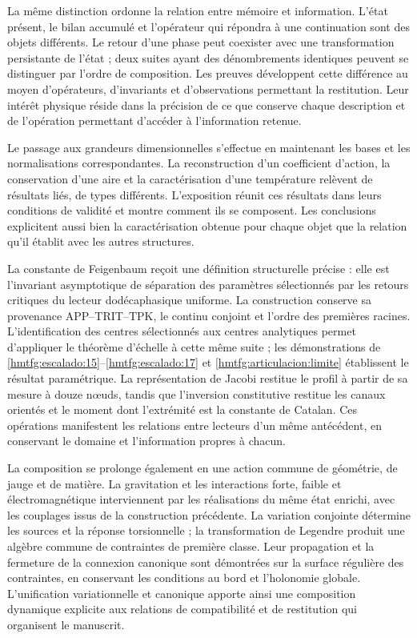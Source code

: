 La même distinction ordonne la relation entre mémoire et information. L'état présent, le bilan accumulé et l'opérateur qui répondra à une continuation sont des objets différents. Le retour d'une phase peut coexister avec une transformation persistante de l'état ; deux suites ayant des dénombrements identiques peuvent se distinguer par l'ordre de composition. Les preuves développent cette différence au moyen d'opérateurs, d'invariants et d'observations permettant la restitution. Leur intérêt physique réside dans la précision de ce que conserve chaque description et de l'opération permettant d'accéder à l'information retenue.

Le passage aux grandeurs dimensionnelles s'effectue en maintenant les bases et les normalisations correspondantes. La reconstruction d'un coefficient d'action, la conservation d'une aire et la caractérisation d'une température relèvent de résultats liés, de types différents. L'exposition réunit ces résultats dans leurs conditions de validité et montre comment ils se composent. Les conclusions explicitent aussi bien la caractérisation obtenue pour chaque objet que la relation qu'il établit avec les autres structures.

La constante de Feigenbaum reçoit une définition structurelle précise : elle est l’invariant asymptotique de séparation des paramètres sélectionnés par les retours critiques du lecteur dodécaphasique uniforme. La construction conserve sa provenance APP--TRIT--TPK, le continu conjoint et l’ordre des premières racines. L’identification des centres sélectionnés aux centres analytiques permet d’appliquer le théorème d’échelle à cette même suite ; les démonstrations de \ref{hmtfg:escalado:15}--\ref{hmtfg:escalado:17} et \eqref{hmtfg:articulacion:limite} établissent le résultat paramétrique. La représentation de Jacobi restitue le profil à partir de sa mesure à douze nœuds, tandis que l’inversion constitutive restitue les canaux orientés et le moment dont l’extrémité est la constante de Catalan. Ces opérations manifestent les relations entre lecteurs d’un même antécédent, en conservant le domaine et l’information propres à chacun.

La composition se prolonge également en une action commune de géométrie, de jauge et de matière. La gravitation et les interactions forte, faible et électromagnétique interviennent par les réalisations du même état enrichi, avec les couplages issus de la construction précédente. La variation conjointe détermine les sources et la réponse torsionnelle ; la transformation de Legendre produit une algèbre commune de contraintes de première classe. Leur propagation et la fermeture de la connexion canonique sont démontrées sur la surface régulière des contraintes, en conservant les conditions au bord et l’holonomie globale. L’unification variationnelle et canonique apporte ainsi une composition dynamique explicite aux relations de compatibilité et de restitution qui organisent le manuscrit.
